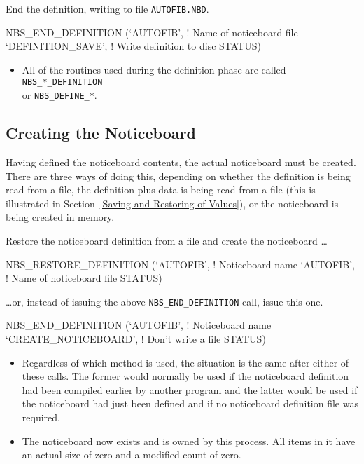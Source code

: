 \documentclass[twoside,11pt,nolof]{starlink}
\begin{document}
End the definition, writing to file \texttt{AUTOFIB.NBD}.

\begin{terminalv}
NBS_END_DEFINITION   (`AUTOFIB',          ! Name of noticeboard file
                      `DEFINITION_SAVE',  ! Write definition to disc
                      STATUS)
\end{terminalv}

\begin {itemize}
\item All of the routines used during the definition phase are called
\texttt{NBS\_*\_DEFINITION} \\
or \texttt{NBS\_DEFINE\_*}.
\end {itemize}

\subsection {Creating the Noticeboard}

Having defined the noticeboard contents, the actual noticeboard must be
created. There are three ways of doing this, depending on whether the
definition is being read from a file, the definition plus data is being read
from a file (this is illustrated in Section~\ref {Saving and Restoring of
Values}), or the noticeboard is being created in memory.

Restore the noticeboard definition from a file and create the noticeboard
\ldots

\begin{terminalv}
NBS_RESTORE_DEFINITION (`AUTOFIB',            ! Noticeboard name
                        `AUTOFIB',            ! Name of noticeboard file
                        STATUS)
\end{terminalv}

\ldots or, instead of issuing the above \texttt{NBS\_END\_DEFINITION} call, issue
this one.

\begin{terminalv}
NBS_END_DEFINITION     (`AUTOFIB',            ! Noticeboard name
                        `CREATE_NOTICEBOARD', ! Don't write a file
                        STATUS)
\end{terminalv}

\begin {itemize}
\item Regardless of which method is used, the situation is the same after either
of these calls. The former would normally be used if the noticeboard definition
had been compiled earlier by another program and the latter would be used if
the noticeboard had just been defined and if no noticeboard definition file was
required.
\item The noticeboard now exists and is owned by this process. All items in it
have an actual size of zero and a modified count of zero.
\end {itemize}
\end{document}
